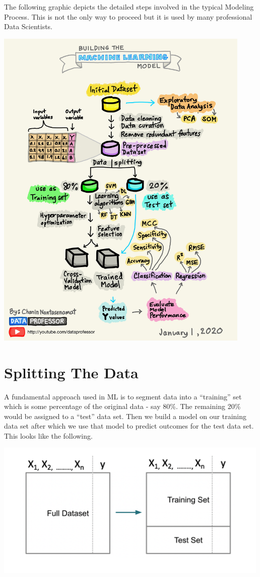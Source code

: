 \documentclass[
]{book}
\begin{document}
The following graphic depicts the detailed steps involved in the typical Modeling Process. This is not the only way to proceed but it is used by many professional Data Scientists.

\includegraphics[width=\textwidth,height=6.25in]{./PICS/sworkflow.jpg}

\hypertarget{splitting-the-data}{%
\section{Splitting The Data}\label{splitting-the-data}}

A fundamental approach used in ML is to segment data into a ``training'' set which is some percentage of the original data - say 80\%. The remaining 20\% would be assigned to a ``test'' data set. Then we build a model on our training data set after which we use that model to predict outcomes for the test data set. This looks like the following.

\includegraphics[width=5.20833in,height=\textheight]{./PICS/train_test.png}
\end{document}
